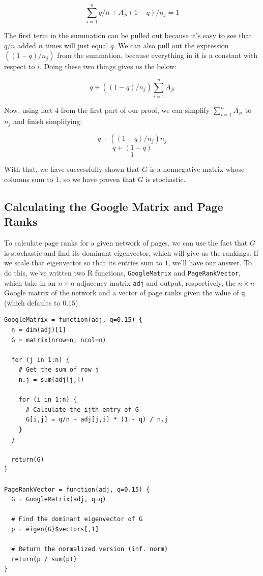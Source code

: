 \documentclass{article}
\begin{document}
$$
\sum_{i=1}^n q/n + A_{ji} (1 - q) / n_j = 1
$$

The first term in the summation can be pulled out because it's easy to see that $q/n$
added $n$ times will just equal $q$. We can also pull out the expression
$((1 - q) / n_j)$ from the summation, because everything in it is a constant with
respect to $i$. Doing these two things gives us the below:

$$
q +  ((1 - q) / n_j) \sum_{i=1}^n A_{ji}
$$

Now, using fact 4 from the first part of our proof, we can simplify $\sum_{i=1}^n A_{ji}$
to $n_j$ and finish simplifying:

$$
q +  ((1 - q) / n_j) n_j
$$
$$
q + (1 - q)
$$
$$
1
$$

With that, we have successfully shown that $G$ is a nonnegative matrix whose columns sum
to $1$, so we have proven that $G$ is stochastic.

\subsection{Calculating the Google Matrix and Page Ranks}

To calculate page ranks for a given network of pages, we can use the fact that $G$ is
stochastic and find its dominant eigenvector, which will give us the rankings. If we
scale that eigenvector so that its entries sum to $1$, we'll have our answer. To do
this, we've written two R functions, \lstinline{GoogleMatrix} and \lstinline{PageRankVector},
which take in an $n \times n$ adjacency matrix \lstinline{adj} and output, respectively,
the $n \times n$ Google matrix of the network and a vector of page ranks given the value
of \lstinline{q} (which defaults to $0.15$).

\begin{verbatim}
GoogleMatrix = function(adj, q=0.15) {
  n = dim(adj)[1]
  G = matrix(nrow=n, ncol=n)
  
  for (j in 1:n) {
    # Get the sum of row j
    n.j = sum(adj[j,])
    
    for (i in 1:n) {
      # Calculate the ijth entry of G
      G[i,j] = q/n + adj[j,i] * (1 - q) / n.j
    }
  }
  
  return(G)
}

PageRankVector = function(adj, q=0.15) {
  G = GoogleMatrix(adj, q=q)
  
  # Find the dominant eigenvector of G
  p = eigen(G)$vectors[,1]
  
  # Return the normalized version (inf. norm)
  return(p / sum(p))
}
\end{verbatim}
\end{document}
